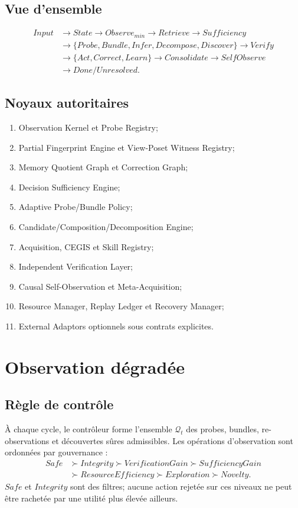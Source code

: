 \documentclass[11pt,a4paper]{report}
\begin{document}
\section{Vue d'ensemble}
\[
\begin{aligned}
Input &\to State \to Observe_{min} \to Retrieve \to Sufficiency \\
&\to \{Probe,Bundle,Infer,Decompose,Discover\} \to Verify \\
&\to \{Act,Correct,Learn\} \to Consolidate \to SelfObserve \\
&\to Done/Unresolved.
\end{aligned}
\]
\section{Noyaux autoritaires}
\begin{enumerate}
\item Observation Kernel et Probe Registry;
\item Partial Fingerprint Engine et View-Poset Witness Registry;
\item Memory Quotient Graph et Correction Graph;
\item Decision Sufficiency Engine;
\item Adaptive Probe/Bundle Policy;
\item Candidate/Composition/Decomposition Engine;
\item Acquisition, CEGIS et Skill Registry;
\item Independent Verification Layer;
\item Causal Self-Observation et Meta-Acquisition;
\item Resource Manager, Replay Ledger et Recovery Manager;
\item External Adaptors optionnels sous contrats explicites.
\end{enumerate}

\chapter{Observation dégradée}
\section{Règle de contrôle}
À chaque cycle, le contrôleur forme l'ensemble $\mathcal Q_t$ des probes, bundles, re-observations et découvertes sûres admissibles. Les opérations d'observation sont ordonnées par gouvernance :
\[
\begin{aligned}
Safe &\succ Integrity \succ VerificationGain \succ SufficiencyGain \\
&\succ ResourceEfficiency \succ Exploration \succ Novelty.
\end{aligned}
\]
$Safe$ et $Integrity$ sont des filtres; aucune action rejetée sur ces niveaux ne peut être rachetée par une utilité plus élevée ailleurs.
\end{document}
